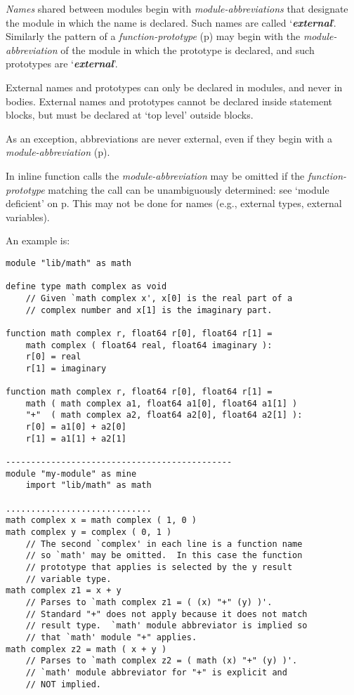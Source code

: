 \documentclass[12pt]{article}
\newcommand{\key}[1]{{\bf \em #1}\index{#1}}
\newcommand{\pagref}[1]{p\pageref{#1}}
\newenvironment{indpar}[1][0.3in]%
	{\begin{list}{}%
		     {\setlength{\itemsep}{0in}%
		      \setlength{\topsep}{0in}%
		      \setlength{\parsep}{1ex}%
		      \setlength{\labelwidth}{#1}%
		      \setlength{\leftmargin}{#1}%
		      \addtolength{\leftmargin}{\labelsep}}%
	 \item}%
	{\end{list}}
\begin{document}
{\em Names} shared between modules begin with {\em module-abbreviations}
that designate the module in which the name is declared.
Such names are called `\key{external}'.\label{EXTERNAL}
Similarly the pattern of a {\em function-prototype}
(\pagref{FUNCTION-PROTOTYPE})
may begin with the {\em module-abbreviation} of the module in
which the prototype is declared,
and such prototypes are `\key{external}'.

External names and prototypes can only be declared in modules, and
never in bodies.  External names and prototypes cannot be declared inside
statement blocks, but must be declared at `top level' outside
blocks.

As an exception, abbreviations are never external, even if
they begin with a {\em module-abbreviation}
(\pagref{ABBREVIATIONS-ARE-NOT-EXTERNAL}).

In inline function calls the
{\em module-abbreviation} may be omitted
if the {\em function-prototype} matching the call
can be unambiguously determined: see
`module deficient' on \pagref{MODULE-DEFICIENT}.
This may not be done
for names (e.g., external types, external variables).

An example is:
\begin{indpar}\begin{verbatim}
module "lib/math" as math

define type math complex as void
    // Given `math complex x', x[0] is the real part of a
    // complex number and x[1] is the imaginary part.

function math complex r, float64 r[0], float64 r[1] =
    math complex ( float64 real, float64 imaginary ):
    r[0] = real
    r[1] = imaginary

function math complex r, float64 r[0], float64 r[1] =
    math ( math complex a1, float64 a1[0], float64 a1[1] )
    "+"  ( math complex a2, float64 a2[0], float64 a2[1] ):
    r[0] = a1[0] + a2[0]
    r[1] = a1[1] + a2[1]

---------------------------------------------
module "my-module" as mine
    import "lib/math" as math

.............................
math complex x = math complex ( 1, 0 )
math complex y = complex ( 0, 1 )
    // The second `complex' in each line is a function name
    // so `math' may be omitted.  In this case the function
    // prototype that applies is selected by the y result
    // variable type.
math complex z1 = x + y
    // Parses to `math complex z1 = ( (x) "+" (y) )'.
    // Standard "+" does not apply because it does not match
    // result type.  `math' module abbreviator is implied so
    // that `math' module "+" applies.
math complex z2 = math ( x + y )
    // Parses to `math complex z2 = ( math (x) "+" (y) )'.
    // `math' module abbreviator for "+" is explicit and
    // NOT implied.
\end{verbatim}\end{indpar}
\end{document}
